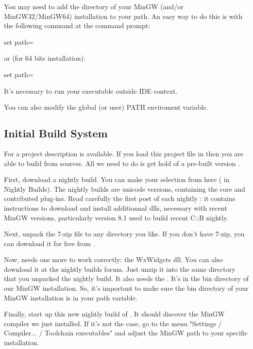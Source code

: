 You may need to add the  directory of your MinGW (and/or MinGW32/MinGW64) installation to your path. An easy way to do this is with the following command at the command prompt:

\begin{cmd}
set path=%
\end{cmd}
or (for 64 bits installation):
\begin{cmd}
set path=%
\end{cmd}

It's necessary to run your executable outside \codeblocks IDE context.

You can also modify the global (or user) PATH enviroment variable.


\subsection{Initial Build System}

For \cite{url:cb} a project description  is available. If you load this project file in \codeblocks then you are able to build \codeblocks from sources. All we need to do is get hold of a pre-built version \codeblocks.

First, download a nightly build. You can make your selection from here (\cite{url:cbforum} in Nightly Builds). The nightly builds are unicode versions, containing the core and contributed plug-ins. Read carefully the first post of each nightly : it contains instructions to download and install additionnal dlls, necessary with recent MinGW versions, particularly version 8.1 used to build recent C::B nightly.

Next, unpack the 7-zip file to any directory you like. If you don't have 7-zip, you can download it for free from \cite{url:zip}.

Now, \codeblocks needs one more  to work correctly: the WxWidgets dll. You can also download it at the nightly builds forum. Just unzip it into the same directory that you unpacked the \codeblocks nightly build. It also needs the . It's in the bin directory of our MinGW installation. So, it's important to make sure the bin directory of your MinGW installation is in your path variable.

Finally, start up this new nightly build of \codeblocks. It should discover the MinGW compiler we just installed. If it's not the case, go to the menu "Settings / Compiler... / Toolchain executables" and adjust the MinGW path to your specific installation.

